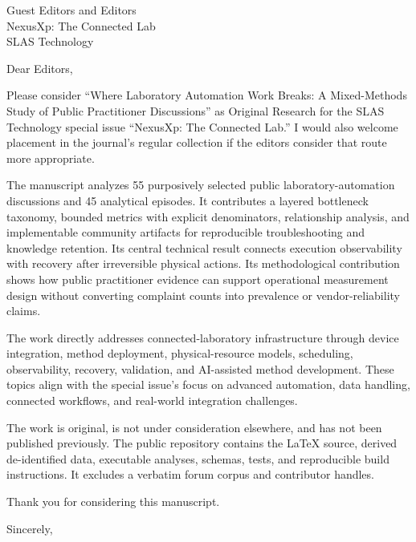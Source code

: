 \documentclass[10pt]{letter}
\begin{document}
\begin{letter}{Guest Editors and Editors\\NexusXp: The Connected Lab\\SLAS Technology}
\opening{Dear Editors,}

Please consider ``Where Laboratory Automation Work Breaks: A Mixed-Methods Study of Public Practitioner Discussions'' as Original Research for the SLAS Technology special issue ``NexusXp: The Connected Lab.'' I would also welcome placement in the journal's regular collection if the editors consider that route more appropriate.

The manuscript analyzes 55 purposively selected public laboratory-automation discussions and 45 analytical episodes. It contributes a layered bottleneck taxonomy, bounded metrics with explicit denominators, relationship analysis, and implementable community artifacts for reproducible troubleshooting and knowledge retention. Its central technical result connects execution observability with recovery after irreversible physical actions. Its methodological contribution shows how public practitioner evidence can support operational measurement design without converting complaint counts into prevalence or vendor-reliability claims.

The work directly addresses connected-laboratory infrastructure through device integration, method deployment, physical-resource models, scheduling, observability, recovery, validation, and AI-assisted method development. These topics align with the special issue's focus on advanced automation, data handling, connected workflows, and real-world integration challenges.

The work is original, is not under consideration elsewhere, and has not been published previously. The public repository contains the LaTeX source, derived de-identified data, executable analyses, schemas, tests, and reproducible build instructions. It excludes a verbatim forum corpus and contributor handles.

Thank you for considering this manuscript.

\closing{Sincerely,}
\end{letter}
\end{document}
